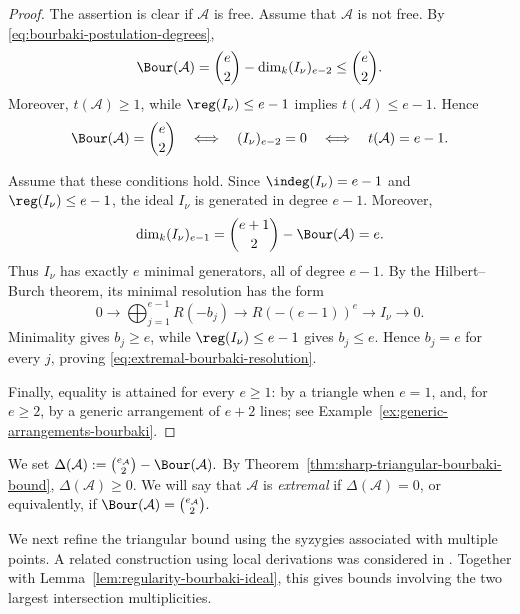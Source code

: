 \documentclass[11pt]{amsart}   %
\theoremstyle{definition}
\def\A{{\mathcal A}}
\begin{document}
\begin{proof}
The assertion is clear if $\A$ is free. Assume that $\A$ is not free. By \eqref{eq:bourbaki-postulation-degrees},
\[
\Bour(\A)
=\binom e2-\dim_k(I_\nu)_{e-2}
\leq\binom e2.
\]
Moreover, $t(\A)\geq1$, while $\reg(I_\nu)\leq e-1$ implies $t(\A)\leq e-1$. Hence
\[
\Bour(\A)=\binom e2
\quad\Longleftrightarrow\quad (I_\nu)_{e-2}=0 \quad\Longleftrightarrow\quad t(\A)=e-1.
\]

Assume that these conditions hold. Since $\indeg(I_\nu)=e-1$ and $\reg(I_\nu)\leq e-1$, the ideal $I_\nu$ is generated in degree $e-1$. Moreover,
\[
\dim_k(I_\nu)_{e-1}
=\binom{e+1}{2}-\Bour(\A)
=e.
\]
Thus $I_\nu$ has exactly $e$ minimal generators, all of degree $e-1$. By the Hilbert--Burch theorem, its minimal resolution has the form
\[
0\longrightarrow\bigoplus_{j=1}^{e-1}R(-b_j)
\longrightarrow R(-(e-1))^e \longrightarrow I_\nu\longrightarrow0.
\]
Minimality gives $b_j\geq e$, while $\reg(I_\nu)\leq e-1$ gives $b_j\leq e$. Hence $b_j=e$ for every $j$, proving \eqref{eq:extremal-bourbaki-resolution}.

Finally, equality is attained for every $e\geq1$: by a triangle when
$e=1$, and, for $e\geq2$, by a generic arrangement of $e+2$ lines;
see Example~\ref{ex:generic-arrangements-bourbaki}.
\end{proof}

We set $\Delta(\A):=\binom{e_\A}{2}-\Bour(\A).$ By Theorem~\ref{thm:sharp-triangular-bourbaki-bound}, $\Delta(\A)\geq0$. We will say that $\A$ is \emph{extremal} if $\Delta(\A)=0$, or equivalently, if $\Bour(\A)=\binom{e_\A}{2}.$

We next refine the triangular bound using the syzygies associated with multiple points. A related construction using local derivations was considered in \cite[Proposition~5.1]{Dimca-local-derivations}. Together with Lemma~\ref{lem:regularity-bourbaki-ideal}, this gives bounds involving the two largest intersection multiplicities.
\end{document}

